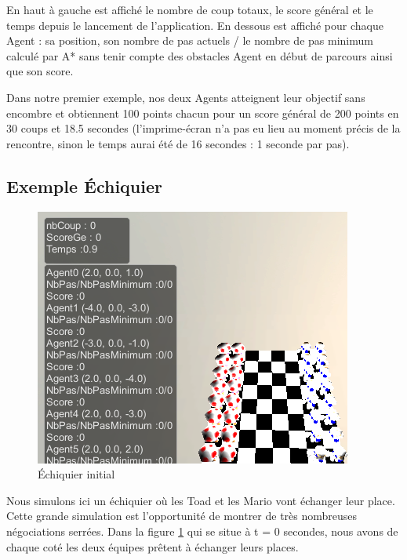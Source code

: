 \documentclass[11pt]{article}
\begin{document}
  En haut à gauche est affiché le nombre de coup totaux, le score général et le temps depuis le lancement de l'application.
  En dessous est affiché pour chaque Agent : sa position, son nombre de pas actuels / le nombre de pas minimum calculé par A* sans tenir compte des obstacles Agent en début de parcours ainsi que son score.
  
  Dans notre premier exemple, nos deux Agents atteignent leur objectif sans encombre et obtiennent 100 points chacun pour un score général de 200 points en 30 coups et 18.5 secondes (l'imprime-écran n'a pas eu lieu au moment précis de la rencontre, sinon le temps aurai été de 16 secondes : 1 seconde par pas).
  
  
  
  \subsection{Exemple \'Echiquier}
  
   \begin{figure}[H]
      \centering
      \includegraphics[scale=0.7]{Image/echequierDebut.png} 
      \caption{\'Echiquier initial}
      \label{fig:échiquierDebut}
  \end{figure}
   
  
  Nous simulons ici un échiquier où les Toad et les Mario vont échanger leur place. 
  Cette grande simulation est l'opportunité de montrer de très nombreuses négociations serrées.
  Dans la figure \ref{fig:échiquierDebut} qui se situe à t = 0 secondes, nous avons de chaque coté les deux équipes prêtent à échanger leurs places.
  
\end{document}
